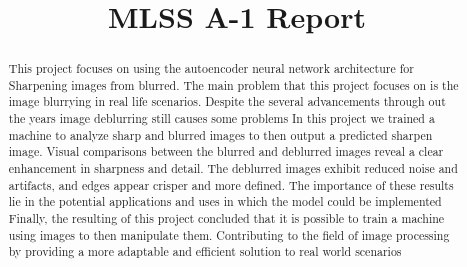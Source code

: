 \documentclass[conference]{IEEEtran}
\begin{document}
\title{MLSS A-1 Report\\
}

\author{
\and

}

\maketitle

\begin{abstract}
This project focuses on using the autoencoder neural network architecture for Sharpening images from blurred. 
The main problem that this project focuses on is the image blurrying in real life scenarios. 
Despite the several advancements through out the years image deblurring still causes some problems
In this project we trained a machine to analyze sharp and blurred images to then output a predicted sharpen image.
Visual comparisons between the blurred and deblurred images reveal a clear enhancement in sharpness and detail. 
The deblurred images exhibit reduced noise and artifacts, and edges
appear crisper and more defined.
The importance of these results lie in the potential applications and uses in which the model could be implemented
Finally, the resulting of this project concluded that it is possible to train a machine using images to then manipulate them.
Contributing to the field of image processing by providing a more adaptable and efficient solution to real world scenarios







\end{abstract}
\end{document}
